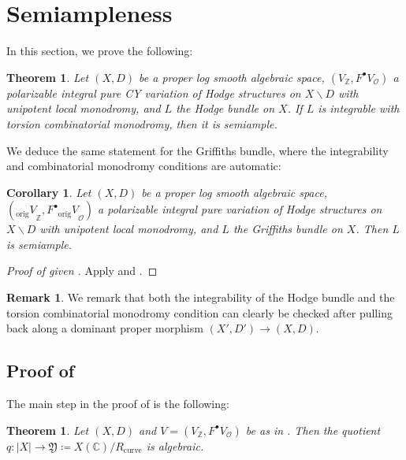 \documentclass{amsart}
\newcommand{\bs}{\backslash}
\newtheorem{cor}[theorem]{Corollary}
\newtheorem{thm}[theorem]{Theorem}
\theoremstyle{definition}
\newtheorem{rem}[theorem]{Remark}
\theoremstyle{remark}
\def\bZ{\mathbb{Z}}
\def\bC{\mathbb{C}}
\def\cO{\mathcal{O}}
\def\orig{\mathrm{orig}}
\def\fY{\mathfrak{Y}}
\numberwithin{equation}{section}
\begin{document}

\section{Semiampleness}\label{sect:semiample}

In this section, we prove the following:
\begin{thm}\label{thm:semiample Hodge}
Let $( X,D)$ be a proper log smooth algebraic space,  $(V_\bZ,F^\bullet V_\cO)$ a polarizable integral pure CY variation of Hodge structures on $X\bs D$ with unipotent local monodromy, and $L$ the Hodge bundle on $X$.  If $ L$ is integrable with torsion combinatorial monodromy, then it is semiample. 
\end{thm}
We deduce the same statement for the Griffiths bundle, where the integrability and combinatorial monodromy conditions are automatic:
\begin{cor}\label{thm:semiample Griffiths}
    Let $( X,D)$ be a proper log smooth algebraic space,  $({_\orig V}_\bZ,F^\bullet {_\orig V}_\cO)$ a polarizable integral pure variation of Hodge structures on $X\bs D$ with unipotent local monodromy, and $L$ the Griffiths bundle on $ X$.  Then $ L$ is semiample. 
\end{cor}
\begin{proof}[Proof of  given ]  Apply  and .
\end{proof}
\begin{rem}\label{rem: alteration check}We remark that both the integrability of the Hodge bundle and the torsion combinatorial monodromy condition can clearly be checked after pulling back along a dominant proper morphism $(X',D')\to (X,D)$.
\end{rem}

\subsection{Proof of }
The main step in the proof of  is the following:

\begin{thm}\label{thm:easy algebraize}
    Let $(X,D)$ and $V=(V_\bZ,F^\bullet V_\cO)$ be as in .  Then the quotient $q:|X|\to \fY\coloneqq  X(\bC)/R_\mathrm{curve}$ is algebraic.
\end{thm}
\end{document}
